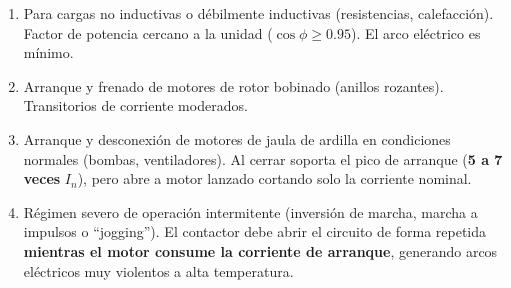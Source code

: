\begin{enumerate}
\begin{enumerate}[label={\textbf{AC-\arabic*}:}, leftmargin=1.8cm, labelindent=0cm, itemsep=0.4cm, align=left]
      \item Para cargas no inductivas o débilmente inductivas (resistencias, calefacción). Factor de potencia cercano a la unidad ($\cos \phi \ge 0.95$). El arco eléctrico es mínimo.
      \item Arranque y frenado de motores de rotor bobinado (anillos rozantes). Transitorios de corriente moderados.
      \item Arranque y desconexión de motores de jaula de ardilla en condiciones normales (bombas, ventiladores). Al cerrar soporta el pico de arranque (\textbf{5 a 7 veces} $I_n$), pero abre a motor lanzado cortando solo la corriente nominal.
      \item Régimen severo de operación intermitente (inversión de marcha, marcha a impulsos o ``jogging''). El contactor debe abrir el circuito de forma repetida \textbf{mientras el motor consume la corriente de arranque}, generando arcos eléctricos muy violentos a alta temperatura.
    
    \end{enumerate}

\end{enumerate}




